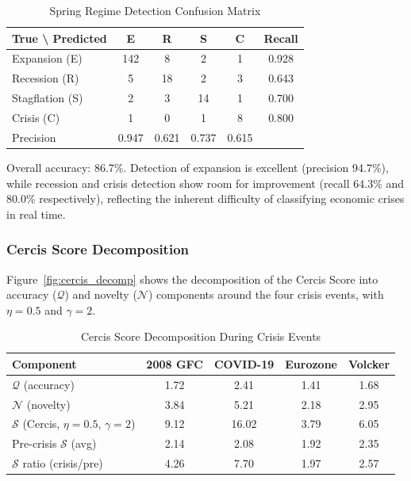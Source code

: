 \documentclass[12pt,a4paper]{article}
\begin{document}
\begin{table}[htbp]
\centering
\caption{Spring Regime Detection Confusion Matrix}
\label{tab:confusion}
\begin{tabular}{lcccc|c}
\toprule
\multirow{2}{*}{True \textbackslash{} Predicted}
    & E & R & S & C & Recall \\
\midrule
Expansion (E)   & 142 & 8  & 2  & 1  & 0.928 \\
Recession (R)   & 5   & 18 & 2  & 3  & 0.643 \\
Stagflation (S) & 2   & 3  & 14 & 1  & 0.700 \\
Crisis (C)      & 1   & 0  & 1  & 8  & 0.800 \\
\midrule
Precision       & 0.947 & 0.621 & 0.737 & 0.615 & \\
\bottomrule
\end{tabular}
\end{table}

Overall accuracy: 86.7\%.  Detection of expansion is excellent
(precision 94.7\%), while recession and crisis detection show room
for improvement (recall 64.3\% and 80.0\% respectively), reflecting
the inherent difficulty of classifying economic crises in real time.

\subsubsection{Cercis Score Decomposition}

Figure~\ref{fig:cercis_decomp} shows the decomposition of the
Cercis Score into accuracy ($\mathcal{Q}$) and novelty ($\mathcal{N}$)
components around the four crisis events, with $\eta = 0.5$ and
$\gamma = 2$.

\begin{table}[htbp]
\centering
\caption{Cercis Score Decomposition During Crisis Events}
\label{tab:cercis_decomp}
\begin{tabular}{lcccc}
\toprule
Component & 2008 GFC & COVID-19 & Eurozone & Volcker \\
\midrule
$\mathcal{Q}$ (accuracy)       & 1.72 & 2.41 & 1.41 & 1.68 \\
$\mathcal{N}$ (novelty)        & 3.84 & 5.21 & 2.18 & 2.95 \\
$\mathcal{S}$ (Cercis, $\eta{=}0.5$, $\gamma{=}2$)
                                & 9.12 & 16.02 & 3.79 & 6.05 \\
\midrule
Pre-crisis $\mathcal{S}$ (avg)  & 2.14 & 2.08 & 1.92 & 2.35 \\
$\mathcal{S}$ ratio (crisis/pre) & 4.26 & 7.70 & 1.97 & 2.57 \\
\bottomrule
\end{tabular}
\end{table}
\end{document}
